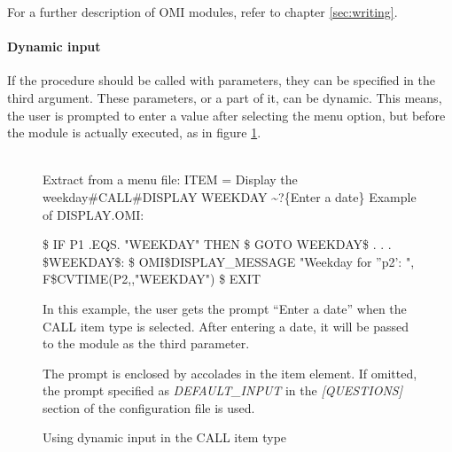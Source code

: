 \documentclass[a4paper]{book}
\begin{document}
For a further description of OMI modules, refer to chapter \ref{sec:writing}.

\paragraph{Dynamic input}\label{para:dyninput}

If the procedure should be called with parameters, they can be specified in 
the third argument. These parameters, or a part of it, can be 
dynamic. This means, the user is prompted to enter a 
value after selecting the menu option, but before the module is actually 
executed, as in figure \ref{fig:dyninput}.

\begin{figure}[h!tb]
\begin{minipage}[h!tb]{\textwidth}
\hrulefill \\
\noindent Extract from a menu file: \newline
\textsf{ITEM = Display the weekday{\#}CALL{\#}DISPLAY WEEKDAY \~{}?{\{}Enter a date{\}}} \newline
\vspace{1mm}
\noindent Example of DISPLAY.OMI: \newline
\begin{ttfamily}
{\$} IF P1 .EQS. "WEEKDAY" THEN {\$} GOTO WEEKDAY{\$} \newline
 . \newline
 . \newline
 . \newline
{\$}WEEKDAY{\$}: \newline
{\$} OMI{\$}DISPLAY{\_}MESSAGE "Weekday for ''p2': ", F{\$}CVTIME(P2,,"WEEKDAY") \newline
{\$} EXIT \newline
\end{ttfamily}
\noindent In this example, the user gets the prompt ``Enter a date'' when the CALL item 
type is selected. After entering a date, 
it will be passed to the module as the third parameter.

The prompt is enclosed by accolades in the item element. If omitted, the 
prompt specified as \textsl{DEFAULT{\_}INPUT} in the \textsl{[QUESTIONS]} section of the 
configuration file is used.
\caption{Using dynamic input in the CALL item type}\label{fig:dyninput}
\hrulefill
\end{minipage}
\end{figure}
\end{document}

